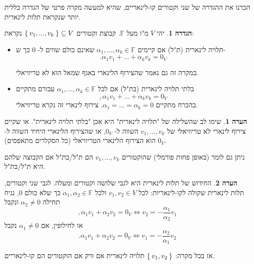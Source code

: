 \documentclass[12pt]{report}
\theoremstyle{plain}
\theoremstyle{definition}
\newtheorem{definition}[theorem]{הגדרה}
\newtheorem{remark}{הערה}[chapter]
\newcommand{\F}{\mathbb{F}}
\newcommand{\0}{\mathbf{0}}
\begin{document}
הכרנו את ההגדרה של שני וקטורים קו-לינאריים, שהיא למעשה מקרה פרטי של הגדרה כללית יותר שנקראת תלות לינארית.

\begin{definition}
יהי 
$V$
מ"ו מעל
$\F$.
קבוצת וקטורים
$\Set{v_1,...,v_k}\subseteq V$
נקראת:

\begin{itemize}
\item 
תלויה לינארית (ת"ל) אם קיימים 
$\alpha_1,...,\alpha_k\in\F$
שאינם כולם שווים ל-
$0$
כך ש-
$$
.\alpha_1v_1+...+\alpha_kv_k=0_V
$$

במקרה זה גם נאמר שהצירוף הלינארי באגף שמאל הוא לא טריוויאלי.

\item
בלתי תלויה לינארית (בת"ל) אם לכל
$\alpha_1,...,\alpha_k\in\F$
עבורם מתקיים
$$
,\alpha_1v_1+...+\alpha_kv_k=0_V
$$
בהכרח מתקיים
$\alpha_1=...=\alpha_k=0$.
צירוף לינארי זה נקרא טריוויאלי.


\end{itemize}
\end{definition}

\begin{remark}
שימו לב שהשלילה של "תלויה לינארית" היא אכן "בלתי תלויה לינארית". או שקיים צירוף לינארי לא טריוויאלי של 
$v_1,...,v_k$
השווה ל-
$0_V$,
או שהצירוף הלינארי היחיד השווה ל-
$0_V$
הוא הצירוף הלינארי הטריוויאלי (כל הסקלרים מתאפסים).

ניתן גם לומר (באופן פחות פורמלי) שהוקטורים
$v_1,...,v_k$
הם ת"ל/בת"ל אם הקבוצה שלהם היא ת"ל/בת"ל.
\end{remark}

\begin{remark}
החידוש של תלות לינארית היא לגבי שלושה וקטורים ומעלה. לגבי שני וקטורים, תלות לינארית שקולה לקו-לינאריות:
לכל 
$v_1,v_2\in V$
ולכל
$\alpha_1,\alpha_2\in\F$
כך שלא כולם
$0$,
נניח תחילה 
$\alpha_2\neq 0$
ונקבל
$$
,\alpha_1v_1+\alpha_2v_2=0_V \iff  v_2=-\frac{\alpha_1}{\alpha_2}v_1
$$
או לחילופין, אם 
$\alpha_1\neq 0$
נקבל
$$
.\alpha_1v_1+\alpha_2v_2=0_V \iff  v_1=-\frac{\alpha_2}{\alpha_1}v_2
$$

אז בכל מקרה:
$\Set{v_1,v_2}$
תלויה לינארית אם ורק אם הוקטורים הם קו-לינאריים.
\end{remark}
\end{document}
